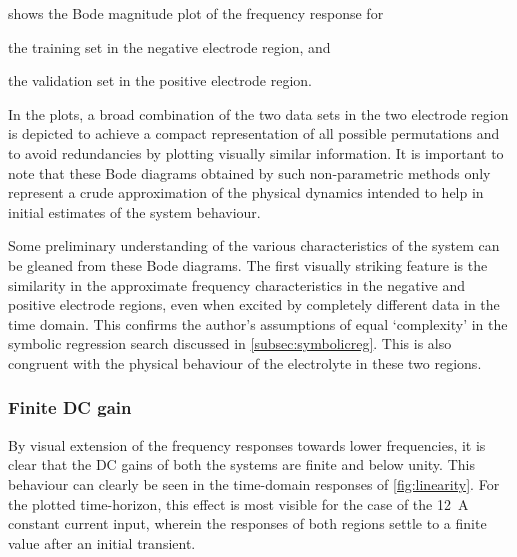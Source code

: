   shows  the  Bode  magnitude  plot  of  the  frequency
response for
\begin{enumerate*}[label=\emph{\alph*})]
    \item the training set in the negative electrode region, and
    \item the validation set in the positive electrode region.
\end{enumerate*}
In the  plots, a broad  combination of  the two data  sets in the  two electrode
region  is  depicted  to  achieve  a  compact  representation  of  all  possible
permutations and to avoid redundancies by plotting visually similar information.
It is important to note that these Bode diagrams obtained by such non-parametric
methods only represent  a crude approximation of the  physical dynamics intended
to help in initial estimates of the system behaviour.

Some preliminary understanding of the  various characteristics of the system can
be gleaned from these Bode diagrams.  The first visually striking feature is the
similarity  in the  approximate frequency  characteristics in  the negative  and
positive electrode  regions, even when  excited by completely different  data in
the time domain. This confirms the author's assumptions of equal `complexity' in
the symbolic  regression search discussed in \cref{subsec:symbolicreg}.  This is
also  congruent with  the physical  behaviour of  the electrolyte  in these  two
regions.

\subsubsection*{Finite DC gain}
By visual  extension of  the frequency responses  towards lower  frequencies, it
is  clear  that  the  DC  gains  of  both  the  systems  are  finite  and  below
unity.  This  behaviour  can  clearly  be  seen  in  the  time-domain  responses
of \cref{fig:linearity}.  For  the plotted  time-horizon,  this  effect is  most
visible for the case of the \SI{12}{\ampere} constant current input, wherein the
responses of both regions settle to a finite value after an initial transient.

